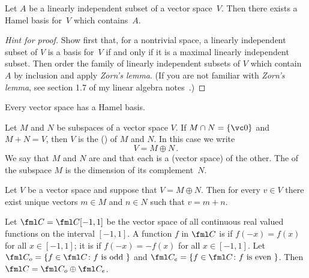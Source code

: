 \begin{prop}\label{bases025} Let $A$ be a linearly independent subset of a vector
space~$V$. Then there exists a Hamel basis for~$V$ which contains~$A$.
\end{prop}

\begin{proof}[\emph{Hint for proof}] Show first that, for a nontrivial space, a linearly independent subset of $V$ is a basis for~$V$
if and only if it is a maximal linearly independent subset. Then order the family of linearly independent subsets of
$V$ which contain~$A$ by inclusion and apply \emph{Zorn's lemma}. (If you are not familiar with \emph{Zorn's lemma},
see section 1.7 of my linear algebra notes~\cite{Erdman:2010}.)  \ns
\end{proof}

\begin{cor} Every vector space has a Hamel basis.
\end{cor}

\begin{defn}\label{000082} Let $M$ and $N$ be subspaces of a vector space $V$. If
$M \cap N = \{\vc 0\}$ and $M + N = V$, then $V$ is the
()  of $M$ and $N$. In this case we write
   \[ V = M \oplus N\,. \]
We say that $M$ and $N$ are
 and that each is a (vector space)  of the
other. The
 of the subspace $M$ is the dimension of its complement~$N$.
\end{defn}

\begin{prop}\label{0000823} Let $V$ be a vector space and suppose that $V = M \oplus N$.  Then for
every $v \in V$ there exist unique vectors $m \in M$ and $n \in N$ such that $v = m + n$.
\end{prop}

\begin{exam} Let $\fml C = \fml C[-1,1]$ be the vector space of all continuous real valued
functions on the interval $[-1,1]$. A function $f$ in $\fml C$ is  if $f(-x) =
f(x)$ for all $x \in [-1,1]$; it is  if $f(-x) = -f(x)$ for all $x \in [-1,1]$.
Let $\fml C_o = \{f \in \fml C\colon  f \text{ is odd }\}$ and $\fml C_e = \{f \in \fml
C\colon  f \text{ is even }\}$. Then $\fml C = \fml C_o \oplus \fml C_e$.
\end{exam}

